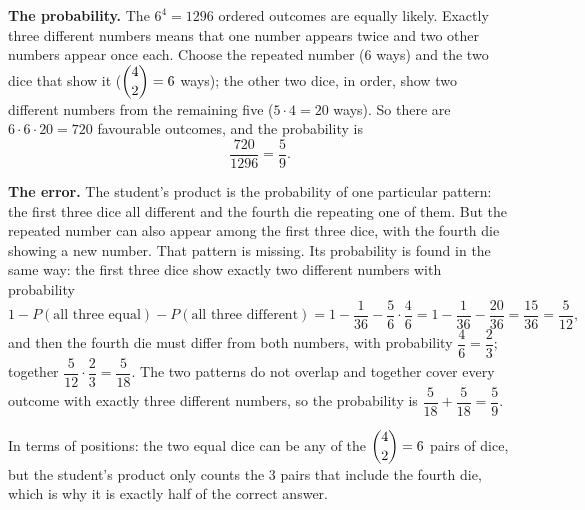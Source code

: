 \textbf{The probability.} The $6^4=1296$ ordered outcomes are equally likely. Exactly three different numbers means that one number appears twice and two other numbers appear once each. Choose the repeated number ($6$ ways) and the two dice that show it ($\dbinom42=6$ ways); the other two dice, in order, show two different numbers from the remaining five ($5\cdot4=20$ ways). So there are $6\cdot6\cdot20=720$ favourable outcomes, and the probability is
\[\dfrac{720}{1296}=\boxed{\dfrac59}.\]

\textbf{The error.} The student's product is the probability of one particular pattern: the first three dice all different and the fourth die repeating one of them. But the repeated number can also appear among the first three dice, with the fourth die showing a new number. That pattern is missing. Its probability is found in the same way: the first three dice show exactly two different numbers with probability
\[1-P(\text{all three equal})-P(\text{all three different})=1-\dfrac{1}{36}-\dfrac56\cdot\dfrac46=1-\dfrac{1}{36}-\dfrac{20}{36}=\dfrac{15}{36}=\dfrac{5}{12},\]
and then the fourth die must differ from both numbers, with probability $\dfrac46=\dfrac23$; together $\dfrac{5}{12}\cdot\dfrac23=\dfrac{5}{18}$. The two patterns do not overlap and together cover every outcome with exactly three different numbers, so the probability is $\dfrac{5}{18}+\dfrac{5}{18}=\dfrac59$.

In terms of positions: the two equal dice can be any of the $\dbinom42=6$ pairs of dice, but the student's product only counts the $3$ pairs that include the fourth die, which is why it is exactly half of the correct answer.
